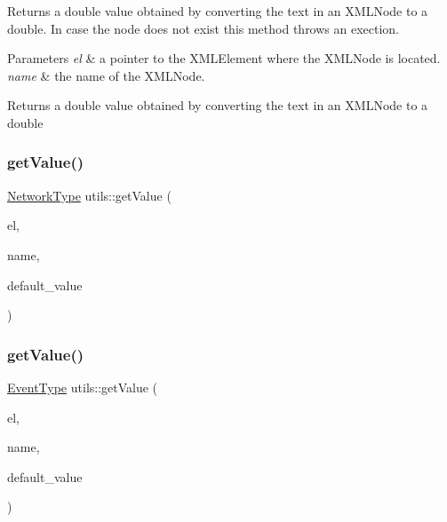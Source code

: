 Returns a double value obtained by converting the text in an X\+M\+L\+Node to a double. In case the node does not exist this method throws an exection. 
\begin{DoxyParams}{Parameters}
{\em el} & a pointer to the X\+M\+L\+Element where the X\+M\+L\+Node is located. \\
\hline
{\em name} & the name of the X\+M\+L\+Node. \\
\hline
\end{DoxyParams}
\begin{DoxyReturn}{Returns}
a double value obtained by converting the text in an X\+M\+L\+Node to a double 
\end{DoxyReturn}
\mbox{\label{namespaceutils_acd49c662e1e988344246493252a10c24}} 
\subsubsection{\texorpdfstring{get\+Value()}{getValue()}\hspace{0.1cm}{\footnotesize\ttfamily [6/7]}}
{\footnotesize\ttfamily \hyperlink{_network_type_8h_a3a159600500d5d7248be5bd1ca1f8d83}{Network\+Type} utils\+::get\+Value (\begin{DoxyParamCaption}\item[{X\+M\+L\+Element $\ast$}]{el,  }\item[{const char $\ast$}]{name,  }\item[{\hyperlink{_network_type_8h_a3a159600500d5d7248be5bd1ca1f8d83}{Network\+Type}}]{default\+\_\+value }\end{DoxyParamCaption})}

\mbox{\label{namespaceutils_a964fe816b9d5757d357a569042651e74}} 
\subsubsection{\texorpdfstring{get\+Value()}{getValue()}\hspace{0.1cm}{\footnotesize\ttfamily [7/7]}}
{\footnotesize\ttfamily \hyperlink{_event_type_8h_a2628ea8d12e8b2563c32f05dc7fff6fa}{Event\+Type} utils\+::get\+Value (\begin{DoxyParamCaption}\item[{X\+M\+L\+Element $\ast$}]{el,  }\item[{const char $\ast$}]{name,  }\item[{\hyperlink{_event_type_8h_a2628ea8d12e8b2563c32f05dc7fff6fa}{Event\+Type}}]{default\+\_\+value }\end{DoxyParamCaption})}

